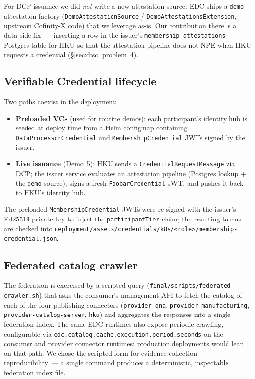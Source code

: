\documentclass[11pt,a4paper]{article}
\DeclareRobustCommand{\code}[1]{\texttt{\small #1}}
\begin{document}
For DCP issuance we did \emph{not} write a new attestation source: EDC ships
a \code{demo} attestation factory (\code{DemoAttestationSource} /
\code{DemoAttestationsExtension}, upstream Cofinity-X code) that we leverage
as-is. Our contribution there is a data-side fix~--- inserting a row in the
issuer's \code{membership\_attestations} Postgres table for HKU so that the
attestation pipeline does not NPE when HKU requests a credential
(§\ref{sec:disc} problem~4).

\subsection{Verifiable Credential lifecycle}

Two paths coexist in the deployment:

\begin{itemize}
  \item \textbf{Preloaded VCs} (used for routine demos): each participant's
    identity hub is seeded at deploy time from a Helm configmap containing
    \code{DataProcessorCredential} and \code{MembershipCredential} JWTs
    signed by the issuer.
  \item \textbf{Live issuance} (Demo~5): HKU sends a
    \code{CredentialRequestMessage} via DCP; the issuer service evaluates an
    attestation pipeline (Postgres lookup + the \code{demo} source), signs
    a fresh \code{FoobarCredential} JWT, and pushes it back to HKU's
    identity hub.
\end{itemize}

The preloaded \code{MembershipCredential} JWTs were re-signed with the
issuer's Ed25519 private key to inject the \code{participantTier} claim;
the resulting tokens are checked into
\code{deployment/assets/credentials/k8s/<role>/membership-credential.json}.

\subsection{Federated catalog crawler}

The federation is exercised by a scripted query
(\code{final/scripts/federated-crawler.sh}) that asks the consumer's
management API to fetch the catalog of each of the four publishing
connectors (\code{provider-qna}, \code{provider-manufacturing},
\code{provider-catalog-server}, \code{hku}) and aggregates the
responses into a single federation index. The same EDC runtimes also
expose periodic crawling, configurable via
\code{edc.catalog.cache.execution.period.seconds} on the consumer and
provider connector runtimes; production deployments would lean on
that path. We chose the scripted form for evidence-collection
reproducibility~--- a single command produces a deterministic,
inspectable federation index file.
\end{document}
